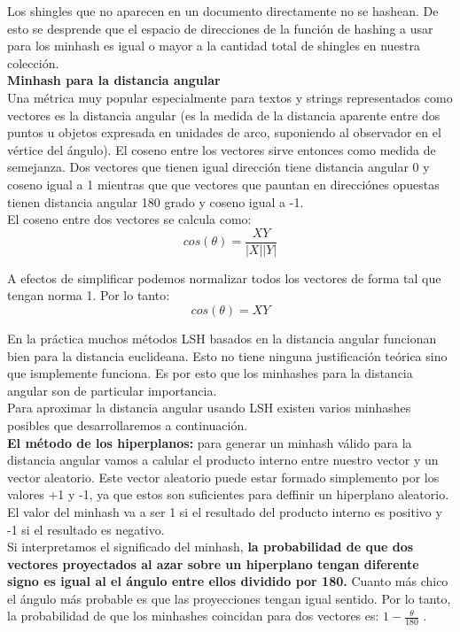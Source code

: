 \documentclass[titlepage,a4paper]{article}
\begin{document}
Los shingles que no aparecen en un documento directamente no se hashean. De esto se desprende que el espacio de direcciones de la función de hashing a usar para los minhash es igual o mayor a la cantidad total de shingles en nuestra colección. \\

\textbf{Minhash para la distancia angular}\\

Una métrica muy popular especialmente para textos y strings representados como vectores es la distancia angular (es la medida de la distancia aparente entre dos puntos u objetos expresada en unidades de arco, suponiendo al observador en el vértice del ángulo). El coseno entre los vectores sirve entonces como medida de semejanza. Dos vectores que tienen igual dirección tiene distancia angular 0 y coseno igual a 1 mientras que que vectores que pauntan en direcciónes opuestas tienen distancia angular 180 grado y coseno igual a -1.\\

El coseno entre dos vectores se calcula como: $$cos(\theta ) = \frac{XY}{|X||Y|}$$

A efectos de simplificar podemos normalizar todos los vectores de forma tal que tengan norma 1. Por lo tanto: $$ cos(\theta ) = XY $$
 
 En la práctica muchos métodos LSH basados en la distancia angular funcionan bien para la distancia euclideana. Esto no tiene ninguna justificación teórica sino que ismplemente funciona. Es por esto que los minhashes para la distancia angular son de particular importancia.\\ 
 
 Para aproximar la distancia angular usando LSH existen varios minhashes posibles que desarrollaremos a continuación. \\
 
 \textbf{El método de los hiperplanos:}  para generar un minhash válido para la distancia angular vamos a calular el producto interno entre nuestro vector y un vector aleatorio. Este vector aleatorio puede estar formado simplemento por los valores +1 y -1, ya que estos son suficientes para deffinir un hiperplano aleatorio. El valor del minhash va a ser 1 si el resultado del producto interno es positivo y -1 si el resultado es negativo. \\ 
 
 Si interpretamos el significado del minhash,  \textbf{la probabilidad de que dos vectores proyectados al azar sobre un hiperplano tengan diferente signo es igual al el ángulo entre ellos dividido por 180.} Cuanto más chico el ángulo más probable es que las proyecciones tengan igual sentido. Por lo tanto, la probabilidad de que los minhashes coincidan para dos vectores es: $1-\frac{\theta}{180} $ . \\
 
\end{document}
